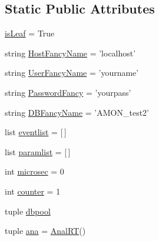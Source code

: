 \subsection*{Static Public Attributes}
\begin{DoxyCompactItemize}
\item 
\hyperlink{classnetwork_1_1amon__server__post_1_1_event_page_a2c4039685dcc225adc4c2a998ebdbc97}{is\-Leaf} = True
\item 
string \hyperlink{classnetwork_1_1amon__server__post_1_1_event_page_ab2d4c291eb38394dd80dc0da415bc8f7}{Host\-Fancy\-Name} = 'localhost'
\item 
string \hyperlink{classnetwork_1_1amon__server__post_1_1_event_page_a99e287cd9a0c3fa9663a18101606fe7c}{User\-Fancy\-Name} = 'yourname'
\item 
string \hyperlink{classnetwork_1_1amon__server__post_1_1_event_page_abf3ce23699c9adfa3508cda1192998c1}{Password\-Fancy} = 'yourpass'
\item 
string \hyperlink{classnetwork_1_1amon__server__post_1_1_event_page_ab13a95bbc99fa0136f178e8dfb59a32d}{D\-B\-Fancy\-Name} = 'A\-M\-O\-N\-\_\-test2'
\item 
list \hyperlink{classnetwork_1_1amon__server__post_1_1_event_page_a758c79966f818aa356316d87052f9c2e}{eventlist} = \mbox{[}$\,$\mbox{]}
\item 
list \hyperlink{classnetwork_1_1amon__server__post_1_1_event_page_a11cfef0e995347ffe8571f8be4dbc41a}{paramlist} = \mbox{[}$\,$\mbox{]}
\item 
int \hyperlink{classnetwork_1_1amon__server__post_1_1_event_page_ac1ec0da9b3424978570e5327b65cbbcc}{microsec} = 0
\item 
int \hyperlink{classnetwork_1_1amon__server__post_1_1_event_page_aa2d1165df8829699de38f4047d8d9b3c}{counter} = 1
\item 
tuple \hyperlink{classnetwork_1_1amon__server__post_1_1_event_page_a27945808b5c4a8cdcde134a10df4965d}{dbpool}
\item 
tuple \hyperlink{classnetwork_1_1amon__server__post_1_1_event_page_acba345bc67164b2162236da6498a94f5}{ana} = \hyperlink{classanalyser_1_1runanal_1_1_anal_r_t}{Anal\-R\-T}()
\end{DoxyCompactItemize}


